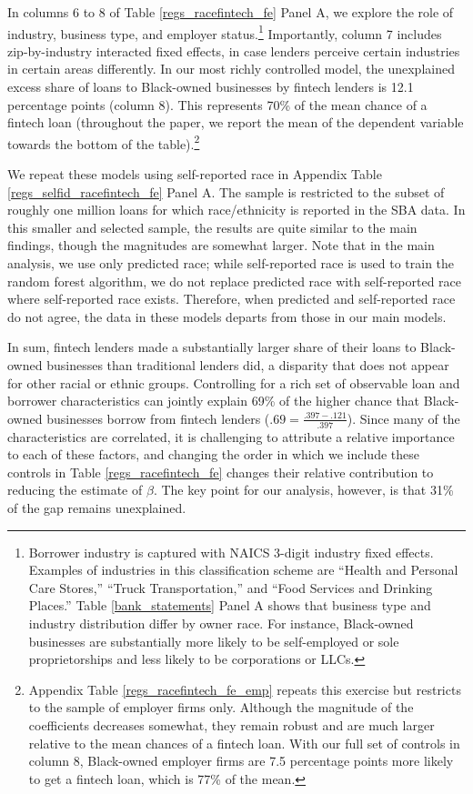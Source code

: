 \documentclass[11pt]{article}
\begin{document}
In columns 6 to 8 of Table \ref{regs_racefintech_fe} Panel A, we explore the role of industry, business type, and employer status.\footnote{Borrower industry is captured with NAICS 3-digit industry fixed effects. Examples of industries in this classification scheme are ``Health and Personal Care Stores,'' ``Truck Transportation,'' and ``Food Services and Drinking Places.'' Table \ref{bank_statements} Panel A shows that business type and industry distribution differ by owner race. For instance, Black-owned businesses are substantially more likely to be self-employed or sole proprietorships and less likely to be corporations or LLCs.} Importantly, column 7 includes zip-by-industry interacted fixed effects, in case lenders perceive certain industries in certain areas differently. In our most richly controlled model, the unexplained excess share of loans to Black-owned businesses by fintech lenders is 12.1 percentage points (column 8). This represents 70\% of the mean chance of a fintech loan (throughout the paper, we report the mean of the dependent variable towards the bottom of the table).\footnote{Appendix Table \ref{regs_racefintech_fe_emp} repeats this exercise but restricts to the sample of employer firms only. Although the magnitude of the coefficients decreases somewhat, they remain robust and are much larger relative to the mean chances of a fintech loan. With our full set of controls in column 8, Black-owned employer firms are 7.5 percentage points more likely to get a fintech loan, which is 77\% of the mean.} 

We repeat these models using self-reported race in Appendix Table \ref{regs_selfid_racefintech_fe} Panel A. The sample is restricted to the subset of roughly one million loans for which race/ethnicity is reported in the SBA data. In this smaller and selected sample, the results are quite similar to the main findings, though the magnitudes are somewhat larger. Note that in the main analysis, we use only predicted race; while self-reported race is used to train the random forest algorithm, we do not replace predicted race with self-reported race where self-reported race exists. Therefore, when predicted and self-reported race do not agree, the data in these models departs from those in our main models. 

In sum, fintech lenders made a substantially larger share of their loans to Black-owned businesses than traditional lenders did, a disparity that does not appear for other racial or ethnic groups. Controlling for a rich set of observable loan and borrower characteristics can jointly explain 69\% of the higher chance that Black-owned businesses borrow from fintech lenders ($.69=\frac{.397-.121}{.397}$). Since many of the characteristics are correlated, it is challenging to attribute a relative importance to each of these factors, and changing the order in which we include these controls in Table  \ref{regs_racefintech_fe} changes their relative contribution to reducing the estimate of $\beta$. The key point for our analysis, however, is that 31\% of the gap remains unexplained. 
\end{document}
